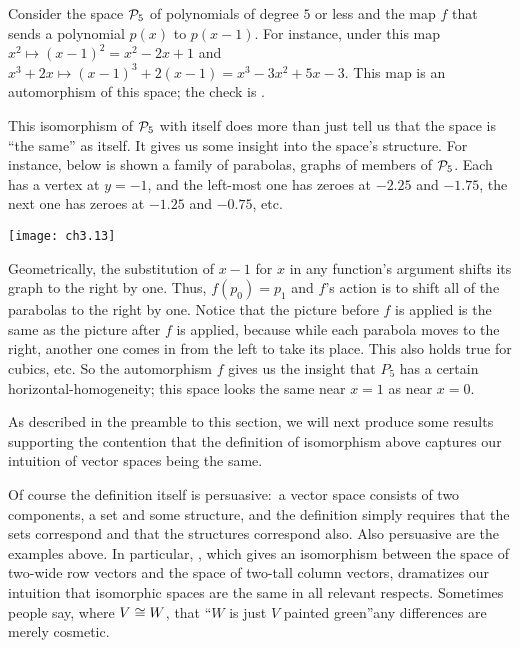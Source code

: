\begin{example} \label{ex:OORThreeToFourLinCom}
Consider the space $\mathcal{P}_5$ of polynomials of degree $5$
or less and the map $f$ that sends a polynomial $p(x)$ to $p(x-1)$.
For instance, under this map $x^2\mapsto (x-1)^2=x^2-2x+1$
and $x^3+2x\mapsto (x-1)^3+2(x-1)=x^3-3x^2+5x-3$.
This map is an automorphism of this space;
the check is .

This isomorphism of $\mathcal{P}_5$ with itself does more than just tell us
that the space is ``the same'' as itself.
It gives us some insight into the space's structure.
For instance, below is shown a family of parabolas, graphs of members of 
$\mathcal{P}_5$.
Each has a vertex at $y=-1$, and  
the left-most one has zeroes at $-2.25$ and $-1.75$, 
the next one has zeroes at $-1.25$ and $-0.75$, etc.
\begin{center}
  \texttt{[image: ch3.13]}                                
\end{center}
Geometrically, the substitution of \( x-1 \) for \( x \) in any function's
argument shifts its graph to the right by one.
Thus, $f(p_0)=p_1$ and 
$f$'s action is to shift all of the parabolas to the right by one.
Notice that the picture before $f$ is applied is the same as the 
picture after $f$ is applied, because while each parabola moves to the 
right, another one comes in from the left to take its place.
This also holds true for cubics, etc.
So the automorphism $f$ gives us the insight that $P_5$  
has a certain
horizontal-homogeneity; this space looks the same near $x=1$ as near $x=0$. 
\end{example}


As described in the preamble to this section, we will next 
produce some results supporting the
contention that the definition of isomorphism above  
captures our intuition of vector spaces being the same.

Of course the definition itself is persuasive:~a vector space 
consists of two components, a set and some structure, 
and the definition simply requires
that the sets correspond and that the structures correspond also.
Also persuasive are the examples above.
In particular, , which
gives an isomorphism between the space of two-wide row vectors and 
the space of two-tall column vectors,
dramatizes our intuition that isomorphic spaces are
the same in all relevant respects.
Sometimes people say, where \( V\cong W \), that ``\( W \) is just
\( V \) painted green''\Dash any differences are merely cosmetic.

